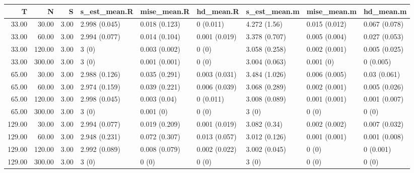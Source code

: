 \begin{table}[ht]
\centering
\begin{tabular}{rrrllllll}
  \hline
T & N & S & s\_est\_mean.R & mise\_mean.R & hd\_mean.R & s\_est\_mean.m & mise\_mean.m & hd\_mean.m \\ 
  \hline
33.00 & 30.00 & 3.00 & 2.998 (0.045) & 0.018 (0.123) & 0 (0.011) & 4.272 (1.56) & 0.015 (0.012) & 0.067 (0.078) \\ 
  33.00 & 60.00 & 3.00 & 2.994 (0.077) & 0.014 (0.104) & 0.001 (0.019) & 3.378 (0.707) & 0.005 (0.004) & 0.027 (0.053) \\ 
  33.00 & 120.00 & 3.00 & 3 (0) & 0.003 (0.002) & 0 (0) & 3.058 (0.258) & 0.002 (0.001) & 0.005 (0.025) \\ 
  33.00 & 300.00 & 3.00 & 3 (0) & 0.001 (0.001) & 0 (0) & 3.004 (0.063) & 0.001 (0) & 0 (0.005) \\ 
  65.00 & 30.00 & 3.00 & 2.988 (0.126) & 0.035 (0.291) & 0.003 (0.031) & 3.484 (1.026) & 0.006 (0.005) & 0.03 (0.061) \\ 
  65.00 & 60.00 & 3.00 & 2.974 (0.159) & 0.039 (0.221) & 0.006 (0.039) & 3.068 (0.289) & 0.002 (0.001) & 0.005 (0.026) \\ 
  65.00 & 120.00 & 3.00 & 2.998 (0.045) & 0.003 (0.04) & 0 (0.011) & 3.008 (0.089) & 0.001 (0.001) & 0.001 (0.007) \\ 
  65.00 & 300.00 & 3.00 & 3 (0) & 0.001 (0) & 0 (0) & 3 (0) & 0 (0) & 0 (0) \\ 
  129.00 & 30.00 & 3.00 & 2.994 (0.077) & 0.019 (0.209) & 0.001 (0.019) & 3.082 (0.34) & 0.002 (0.002) & 0.007 (0.032) \\ 
  129.00 & 60.00 & 3.00 & 2.948 (0.231) & 0.072 (0.307) & 0.013 (0.057) & 3.012 (0.126) & 0.001 (0.001) & 0.001 (0.008) \\ 
  129.00 & 120.00 & 3.00 & 2.992 (0.089) & 0.008 (0.079) & 0.002 (0.022) & 3.002 (0.045) & 0 (0) & 0 (0.001) \\ 
  129.00 & 300.00 & 3.00 & 3 (0) & 0 (0) & 0 (0) & 3 (0) & 0 (0) & 0 (0) \\ 
   \hline
\end{tabular}
\end{table}
